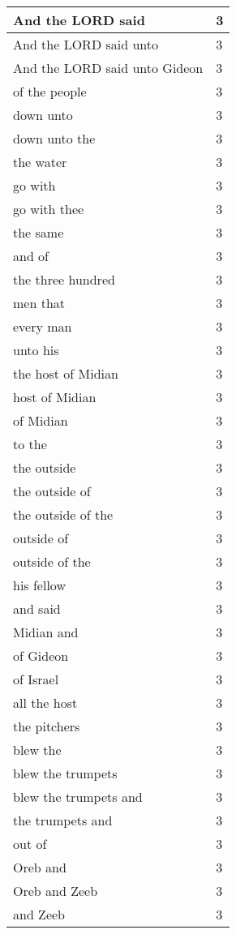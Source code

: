\begin{center}
\begin{longtable}{|p{3.0in}|p{0.5in}|}
And the LORD said & 3\\ \hline 
And the LORD said unto & 3\\ \hline 
And the LORD said unto Gideon & 3\\ \hline 
of the people & 3\\ \hline 
down unto & 3\\ \hline 
down unto the & 3\\ \hline 
the water & 3\\ \hline 
go with & 3\\ \hline 
go with thee & 3\\ \hline 
the same & 3\\ \hline 
and of & 3\\ \hline 
the three hundred & 3\\ \hline 
men that & 3\\ \hline 
every man & 3\\ \hline 
unto his & 3\\ \hline 
the host of Midian & 3\\ \hline 
host of Midian & 3\\ \hline 
of Midian & 3\\ \hline 
to the & 3\\ \hline 
the outside & 3\\ \hline 
the outside of & 3\\ \hline 
the outside of the & 3\\ \hline 
outside of & 3\\ \hline 
outside of the & 3\\ \hline 
his fellow & 3\\ \hline 
and said & 3\\ \hline 
Midian and & 3\\ \hline 
of Gideon & 3\\ \hline 
of Israel & 3\\ \hline 
all the host & 3\\ \hline 
the pitchers & 3\\ \hline 
blew the & 3\\ \hline 
blew the trumpets & 3\\ \hline 
blew the trumpets and & 3\\ \hline 
the trumpets and & 3\\ \hline 
out of & 3\\ \hline 
Oreb and & 3\\ \hline 
Oreb and Zeeb & 3\\ \hline 
and Zeeb & 3\\ \hline 
\end{longtable}
\end{center}






